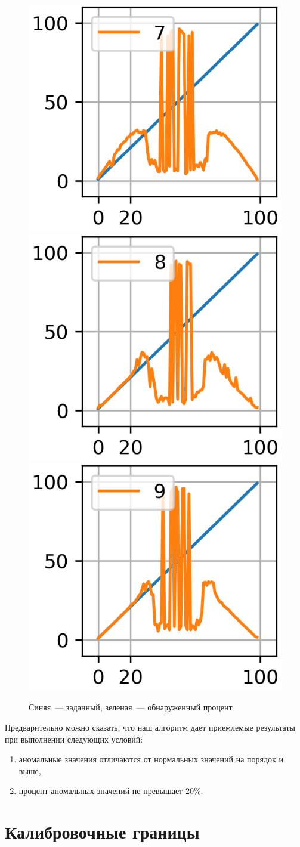 \documentclass[a4paper,12pt]{article}
\begin{document}
\begin{figure}[!h]
	\\
	\includegraphics[width=0.25\linewidth]{pictures/out_pro 7}
	\hspace{0.01\linewidth}
	\includegraphics[width=0.25\linewidth]{pictures/out_pro 8}
	\hspace{0.01\linewidth}
	\includegraphics[width=0.25\linewidth]{pictures/out_pro 9}
	\\
	\caption{Синяя~--- заданный, зеленая~--- обнаруженный процент}
\end{figure}
Предварительно можно сказать, что наш алгоритм дает приемлемые результаты при выполнении следующих условий:

\medskip\noindent
\begin{enumerate}
	\item аномальные значения отличаются от нормальных значений на порядок и выше,
	\item процент аномальных значений не превышает 20\%.
\end{enumerate}

\section{Калибровочные границы}
\end{document}
